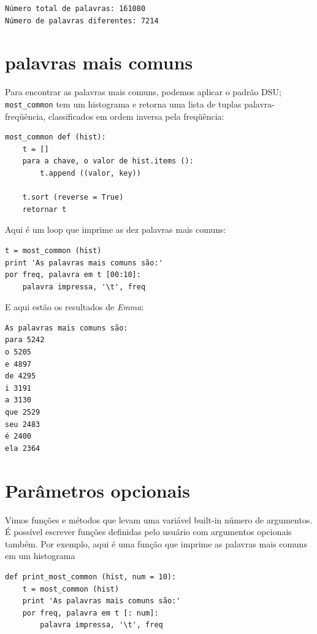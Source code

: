\documentclass[10pt]{book}
\begin{document}
\begin{exercise}
\begin{v erbatim}
\begin{verbatim}
Número total de palavras: 161080
Número de palavras diferentes: 7214
\end{verbatim}
%

\section{palavras mais comuns}

Para encontrar as palavras mais comuns, podemos aplicar o padrão DSU;
\Verb "most_common" tem um histograma e retorna uma lista de
tuplas palavra-freqüência, classificados em ordem inversa pela freqüência:

\begin{verbatim}
most_common def (hist):
    t = []
    para a chave, o valor de hist.items ():
        t.append ((valor, key))

    t.sort (reverse = True)
    retornar t
\end{verbatim}
%
Aqui é um loop que imprime as dez palavras mais comuns:

\begin{verbatim}
t = most_common (hist)
print 'As palavras mais comuns são:'
por freq, palavra em t [00:10]:
    palavra impressa, '\t', freq
\end{verbatim}
%
E aqui estão os resultados de {\em Emma}:

\begin{verbatim}
As palavras mais comuns são:
para 5242
o 5205
e 4897
de 4295
i 3191
a 3130
que 2529
seu 2483
é 2400
ela 2364
\end{verbatim}
%

\section{Parâmetros opcionais}

Vimos funções e métodos que levam uma variável built-in
número de argumentos. É possível escrever funções definidas pelo usuário
com argumentos opcionais também. Por exemplo, aqui é uma função que
imprime as palavras mais comuns em um histograma

\begin{verbatim}
def print_most_common (hist, num = 10):
    t = most_common (hist)
    print 'As palavras mais comuns são:'
    por freq, palavra em t [: num]:
        palavra impressa, '\t', freq
\end{verbatim}


\end{v erbatim}
\end{exercise}
\end{document}
